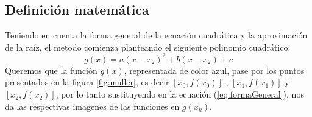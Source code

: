 \documentclass[ceqn,10pt]{SelfArx}
\begin{document}
\subsection{Definición matemática}

Teniendo en cuenta la forma general de la ecuación cuadrática y la aproximación de la raíz,
el metodo comienza planteando el siguiente polinomio cuadrático:
\begin{equation} \label{eq:formaGeneral}
	g(x)=a(x-x_{2})^2+b(x-x_{2})+c
\end{equation}
Queremos que la función $g(x)$, representada de color azul, pase por los puntos presentados en la figura \ref*{fig:muller},
 es decir $[x_{0},f(x_{0})]$ , $[x_{1},f(x_{1})]$ y $[x_{2},f(x_{2})]$, por lo tanto sustituyendo en la ecuación (\ref*{eq:formaGeneral}),
 nos da las respectivas imagenes de las funciones en $g(x_{k})$.
\end{document}
